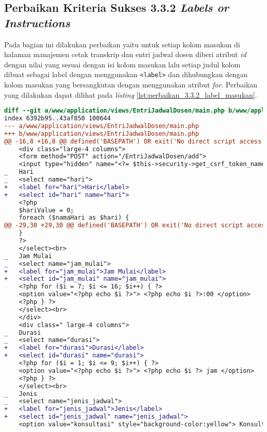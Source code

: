 \subsection{Perbaikan Kriteria Sukses 3.3.2 \textit{Labels or Instructions}}
\label{subsec:perbaikan_kriteria_sukses_3.3.2}
Pada bagian ini dilakukan perbaikan yaitu untuk setiap kolom masukan di halaman manajemen cetak transkrip dan entri jadwal dosen diberi atribut \textit{id} dengan nilai yang sesuai dengan isi kolom masukan lalu setiap judul kolom dibuat sebagai label dengan menggunakan \texttt{<label>} dan dihubungkan dengan kolom masukan yang bersangkutan dengan menggunakan atribut \textit{for}. Perbaikan yang dilakukan dapat dilihat pada \textit{listing} \ref{lst:perbaikan_3.3.2_label_masukan}.

\begin{lstlisting}[frame=single, label={lst:perbaikan_3.3.2_label_masukan}, language=diff, caption=Perbaikan Kriteria Sukses 3.3.2]
diff --git a/www/application/views/EntriJadwalDosen/main.php b/www/application/views/EntriJadwalDosen/main.php
index 6392b95..43af850 100644
--- a/www/application/views/EntriJadwalDosen/main.php
+++ b/www/application/views/EntriJadwalDosen/main.php
@@ -16,8 +16,8 @@ defined('BASEPATH') OR exit('No direct script access allowed');
    <div class="large-4 columns">
    <form method="POST" action="/EntriJadwalDosen/add">
    <input type="hidden" name="<?= $this->security->get_csrf_token_name() ?>" value="<?= $this->security->get_csrf_hash() ?>" />
_   Hari
_   <select name="hari"> 
+   <label for="hari">Hari</label>
+   <select id="hari" name="hari"> 
    <?php
    $hariValue = 0;
    foreach ($namaHari as $hari) {
@@ -29,30 +29,30 @@ defined('BASEPATH') OR exit('No direct script access allowed');
    }
    ?>
    </select><br>
_   Jam Mulai
_   <select name="jam_mulai"> 
+   <label for="jam_mulai">Jam Mulai</label>
+   <select id="jam_mulai" name="jam_mulai">  
    <?php for ($i = 7; $i <= 16; $i++) { ?>
    <option value="<?php echo $i ?>"> <?php echo $i ?>:00 </option>
    <?php } ?>
    </select><br>
    </div>
    <div class=" large-4 columns">
_   Durasi
_   <select name="durasi"> 
+   <label for="durasi">Durasi</label>
+   <select id="durasi" name="durasi">  
    <?php for ($i = 1; $i <= 9; $i++) { ?>
    <option value="<?php echo $i ?>"> <?php echo $i ?> jam </option>
    <?php } ?>
    </select><br>
_   Jenis  
_   <select name="jenis_jadwal"> 
+   <label for="jenis_jadwal">Jenis</label>
+   <select id="jenis_jadwal" name="jenis_jadwal">  
    <option value="konsultasi" style="background-color:yellow"> Konsultasi </option>

\end{lstlisting}
